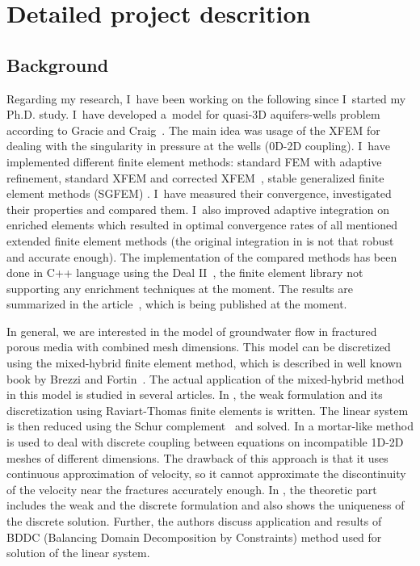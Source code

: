\documentclass{sna}
\begin{document}


\section{Detailed project descrition}
\subsection{Background} \label{sec:background}




Regarding my research, I~have been working on the following since I~started my Ph.D. study. 
I~have developed a~model for quasi-3D aquifers-wells problem according to Gracie and Craig~\cite{gracie_modelling_2010,craig_using_2011}.
The main idea was usage of the XFEM for dealing with the singularity in pressure at the wells (0D-2D coupling).
I~have implemented different finite element methods: standard FEM with adaptive refinement, 
standard XFEM and corrected XFEM~\cite{fries_corrected_2008,fries_xfem_overview_2010},
stable generalized finite element methods (SGFEM) \cite{babuska_stable_2012, gupta_stable_2013}.
I~have measured their convergence, investigated their properties and compared them. 
I~also improved adaptive integration on enriched elements which resulted in optimal convergence rates of
all mentioned extended finite element methods (the original integration in \cite{gracie_modelling_2010,craig_using_2011}
is not that robust and accurate enough). 
The implementation of the compared methods has been done in C++ language using the Deal II~\cite{bangerth_deal.ii_2007}, 
the finite element library not supporting any enrichment techniques at the moment.
The results are summarized in the article~\cite{exner_2015}, which is being published at the moment.


In general, we are interested in the model of groundwater flow in fractured porous media with combined mesh dimensions.
This model can be discretized using the mixed-hybrid finite element method, which is described in
well known book by Brezzi and Fortin~\cite{brezzi_mixed_1991}. 
The actual application of the mixed-hybrid method in this model is studied in several articles.
In \cite{brezina_mixed-hybrid_2010}, the weak formulation and its discretization using Raviart-Thomas finite 
elements is written. The linear system is then reduced using the Schur complement~\cite{maryska_mixed-hybrid_1995}
and solved.
In \cite{brezina_2012} a mortar-like method is used to deal with discrete coupling between equations on incompatible 1D-2D meshes 
of different dimensions. The drawback of this approach is that it uses continuous approximation of velocity, so
it cannot approximate the discontinuity of the velocity near the fractures accurately enough.
In \cite{sistek_bddc_2015}, the theoretic part includes the weak and the discrete formulation and also shows
the uniqueness of the discrete solution. Further, the authors discuss application and results of BDDC 
(Balancing Domain Decomposition by Constraints) method used for solution of the linear system.
\end{document}

